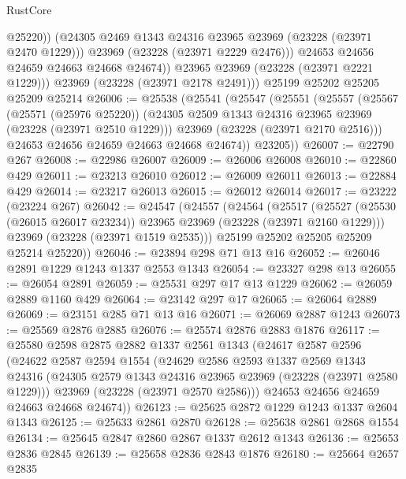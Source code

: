 \begin{lexlean}{RustCore}
\begin{coremodule}
                  @25220))
              (@24305 @2469 @1343 @24316 @23965 @23969 (@23228 (@23971 @2470 @1229)))
              @23969
              (@23228 (@23971 @2229 @2476)))
            @24653
            @24656
            @24659
            @24663
            @24668
            @24674))
        @23965
        @23969
        (@23228 (@23971 @2221 @1229)))
      @23969
      (@23228 (@23971 @2178 @2491)))
    @25199
    @25202
    @25205
    @25209
    @25214
@26006 := @25538
    (@25541
      (@25547
        (@25551
          (@25557
            (@25567
              (@25571 (@25976 @25220))
              (@24305 @2509 @1343 @24316 @23965 @23969 (@23228 (@23971 @2510 @1229)))
              @23969
              (@23228 (@23971 @2170 @2516)))
            @24653
            @24656
            @24659
            @24663
            @24668
            @24674))
        @23205))
@26007 := @22790 @267
@26008 := @22986 @26007
@26009 := @26006 @26008
@26010 := @22860 @429
@26011 := @23213 @26010
@26012 := @26009 @26011
@26013 := @22884 @429
@26014 := @23217 @26013
@26015 := @26012 @26014
@26017 := @23222 (@23224 @267)
@26042 := @24547
    (@24557
      (@24564
        (@25517
          (@25527 (@25530 (@26015 @26017 @23234)) @23965 @23969 (@23228 (@23971 @2160 @1229)))
          @23969
          (@23228 (@23971 @1519 @2535)))
        @25199
        @25202
        @25205
        @25209
        @25214
        @25220))
@26046 := @23894 @298 @71 @13 @16
@26052 := @26046 @2891 @1229 @1243 @1337 @2553 @1343
@26054 := @23327 @298 @13
@26055 := @26054 @2891
@26059 := @25531 @297 @17 @13 @1229
@26062 := @26059 @2889 @1160 @429
@26064 := @23142 @297 @17
@26065 := @26064 @2889
@26069 := @23151 @285 @71 @13 @16
@26071 := @26069 @2887 @1243
@26073 := @25569 @2876 @2885
@26076 := @25574 @2876 @2883 @1876
@26117 := @25580
    @2598
    @2875
    @2882
    @1337
    @2561
    @1343
    (@24617
      @2587
      @2596
      (@24622
        @2587
        @2594
        @1554
        (@24629
          @2586
          @2593
          @1337
          @2569
          @1343
          @24316
          (@24305 @2579 @1343 @24316 @23965 @23969 (@23228 (@23971 @2580 @1229)))
          @23969
          (@23228 (@23971 @2570 @2586)))
        @24653
        @24656
        @24659
        @24663
        @24668
        @24674))
@26123 := @25625 @2872 @1229 @1243 @1337 @2604 @1343
@26125 := @25633 @2861 @2870
@26128 := @25638 @2861 @2868 @1554
@26134 := @25645 @2847 @2860 @2867 @1337 @2612 @1343
@26136 := @25653 @2836 @2845
@26139 := @25658 @2836 @2843 @1876
@26180 := @25664
    @2657
    @2835

\end{coremodule}
\end{lexlean}
